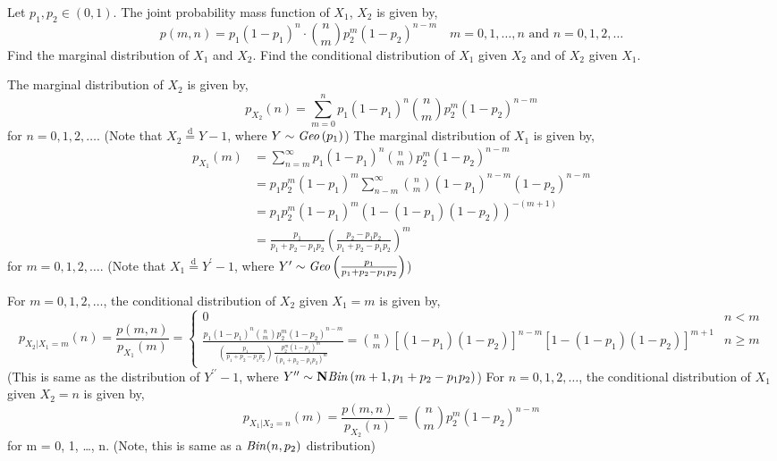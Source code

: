 \begin{example}
Let $p_1, p_2 \in (0, 1)$. The joint probability mass function of $X_1$, $X_2$
is given by,
\[
    p(m, n) = p_1(1 - p_1)^n \cdot {n \choose m} p_2^m (1 - p_2)^{n - m}
    \quad m = 0, 1, \dots, n \text{ and } n = 0, 1, 2, \dots
\]
Find the marginal distribution of $X_1$ and $X_2$. Find the conditional
distribution of $X_1$ given $X_2$ and of $X_2$ given $X_1$.
\end{example}
\begin{solution}
The marginal distribution of $X_2$ is given by,
\[
    p_{X_2}(n) = \sum_{m = 0}^n p_1 (1 - p_1)^n {n \choose m} p_2^m 
                                (1 - p_2)^{n - m}
\]
for $n = 0, 1, 2, \dots$. (Note that $X_2 \overset{\text{d}}{=} Y - 1$, where
$Y \sim \text{\emph{Geo}}\left( p_1 \right)$)
The marginal distribution of $X_1$ is given by, 
\begin{align*}
    p_{X_1}(m) &= \sum_{n = m}^\infty p_1 (1 - p_1)^n {n \choose m} p_2^m
                                      (1 - p_2)^{n - m}                      \\
               &= p_1 p_2^m (1 - p_1)^m
                  \sum_{n - m}^\infty {n \choose m} (1 - p_1)^{n - m}
                                      (1 - p_2)^{n - m}                      \\
               &= p_1 p_2^m (1 - p_1)^m (1 - (1 - p_1)(1 - p_2))^{-(m + 1)}  \\
               &= \frac{p_1}{p_1 + p_2 - p_1 p_2}
                  \left( \frac{p_2 - p_1 p_2}{p_1 + p_2 - p_1 p_2} \right)^m
\end{align*}
for $m = 0, 1, 2, \dots$. (Note that $X_1 \overset{\text{d}}{=} Y^\prime - 1$,
where $Y^\prime \sim \text{\emph{Geo}}\left( \frac{p_1}{p_1 + p_2 - p_1 p_2} \right)$)

For $m = 0, 1, 2, \dots$, the conditional distribution of $X_2$ given $X_1 = m$
is given by,
\[
    p_{X_2 \vert X_1 = m}(n) = \frac{p(m, n)}{p_{X_1}(m)}
                             = \begin{cases}
        0                             & n < m                                \\
        \frac{p_1(1 - p_1)^n{n \choose m}p_2^m (1 - p_2)^{n - m}}
             {\left(\frac{p_1}
                         {p_1 + p_2 - p_1 p_2} \right)
              \frac{p_2^m (1 - p_1)^m}
                   {(p_1 + p_2 - p_1 p_2)^m}}
        = {n \choose m}[(1 - p_1)(1 - p_2)]^{n - m}
          [1 - (1 - p_1)(1 - p_2)]^{m + 1}          & n \geq m 
    \end{cases}
\]
(This is same as the distribution of $Y^{\prime\prime} - 1$, where
$Y^{\prime\prime} \sim \text{$\mathbf{N}$\emph{Bin}}\left( m + 1, p_1 + p_2 - p_1 p_2\right)$)
For $n = 0, 1, 2, \dots$, the conditional distribution of $X_1$ given $X_2 = n$
is given by,
\[
      p_{X_1 \vert X_2 = n}(m) 
    = \frac{p(m, n)}{p_{X_2}(n)} 
    = {n \choose m} p_2^m (1 - p_2)^{n - m}
\]
for m = 0, 1, \dots, n. (Note, this is same as a $\text{\emph{Bin}}(n, p_2)$
distribution)
\end{solution}

